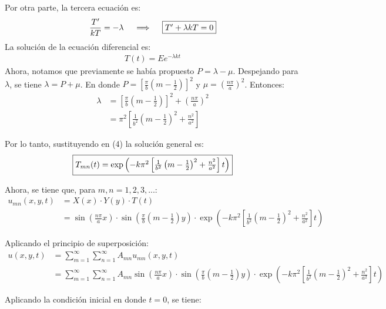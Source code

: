 \begin{solution}
Por otra parte, la tercera ecuación es: 
\begin{gather}
    \frac{T'}{kT}=-\lambda \quad \implies \quad \fbox{$T' +\lambda k T=0$}
\end{gather}
La solución de la ecuación diferencial es: 
\begin{gather}
    T(t)= Ee^{-\lambda k t}
\end{gather}
Ahora, notamos que previamente se había propuesto $P=\lambda-\mu$. Despejando para $\lambda$, se tiene $\lambda = P+\mu$. En donde $P=\left[\frac{\pi}{b}\left(m-\frac{1}{2}\right)\right]^2$ y $\mu = \left(\frac{n\pi}{a}\right)^2$. Entonces:
\begin{align*}
    \lambda &= \left[\frac{\pi}{b}\left(m-\frac{1}{2}\right)\right]^2+\left(\frac{n\pi}{a}\right)^2\\
    &= \pi^2\left[\frac{1}{b^2}\left(m-\frac{1}{2}\right)^2+\frac{n^2}{a^2}\right]
\end{align*}

Por lo tanto, sustituyendo en (4) la solución general es: 
\begin{gather}
    \fbox{$T_{mn}(t) = \exp\left(-k\pi^2\left[\frac{1}{b^2}\left(m-\frac{1}{2}\right)^2+\frac{n^2}{a^2}\right]t\right)$}
\end{gather}

\linea 

Ahora, se tiene que, para $m,n=1,2,3,...$: 
\begin{align*}
    u_{mn}(x,y,t)&= X(x)\cdot Y(y)\cdot T(t)\\
    &= \sin\left(\frac{n\pi}{a}x\right)\cdot \sin\left(\frac{\pi}{b}\left(m-\frac{1}{2}\right) y \right)\cdot \exp\left(-k\pi^2\left[\frac{1}{b^2}\left(m-\frac{1}{2}\right)^2+\frac{n^2}{a^2}\right]t\right)
\end{align*}

\linea 

Aplicando el principio de superposición: 
\begin{align*}
    u(x,y,t) &= \sum_{m=1}^\infty\sum_{n=1}^\infty A_{mn}u_{mn}(x,y,t)\\
    &= \sum_{m=1}^\infty\sum_{n=1}^\infty A_{mn} \sin\left(\frac{n\pi}{a}x\right)\cdot \sin\left(\frac{\pi}{b}\left(m-\frac{1}{2}\right) y \right)\cdot \exp\left(-k\pi^2\left[\frac{1}{b^2}\left(m-\frac{1}{2}\right)^2+\frac{n^2}{a^2}\right]t\right)
\end{align*}

\linea 

Aplicando la condición inicial en donde $t=0$, se tiene: 


\end{solution}
